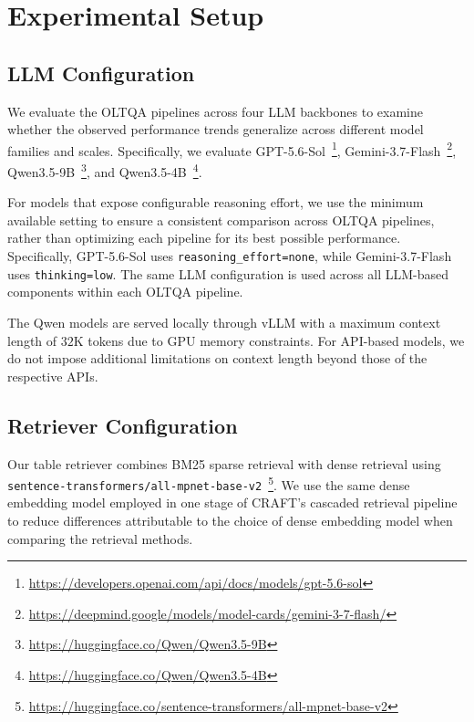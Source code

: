 
\section{Experimental Setup}
\subsection{LLM Configuration}

We evaluate the OLTQA pipelines across four LLM backbones to examine whether the observed performance trends generalize across different model families and scales.
Specifically, we evaluate GPT-5.6-Sol~\footnote{\url{https://developers.openai.com/api/docs/models/gpt-5.6-sol}},
Gemini-3.7-Flash~\footnote{\url{https://deepmind.google/models/model-cards/gemini-3-7-flash/}},
Qwen3.5-9B~\footnote{\url{https://huggingface.co/Qwen/Qwen3.5-9B}},
and Qwen3.5-4B~\footnote{\url{https://huggingface.co/Qwen/Qwen3.5-4B}}.

For models that expose configurable reasoning effort, we use the minimum available setting to ensure a consistent comparison across OLTQA pipelines, rather than optimizing each pipeline for its best possible performance.
Specifically, GPT-5.6-Sol uses \texttt{reasoning\_effort=none}, while Gemini-3.7-Flash uses \texttt{thinking=low}.
The same LLM configuration is used across all LLM-based components within each OLTQA pipeline.

The Qwen models are served locally through vLLM with a maximum context length of $32$K tokens due to GPU memory constraints.
For API-based models, we do not impose additional limitations on context length beyond those of the respective APIs.

\subsection{Retriever Configuration}

Our table retriever combines BM25 sparse retrieval with dense retrieval using \texttt{sentence-transformers/all-mpnet-base-v2}~\footnote{\url{https://huggingface.co/sentence-transformers/all-mpnet-base-v2}}.
We use the same dense embedding model employed in one stage of CRAFT's cascaded retrieval pipeline to reduce differences attributable to the choice of dense embedding model when comparing the retrieval methods.

